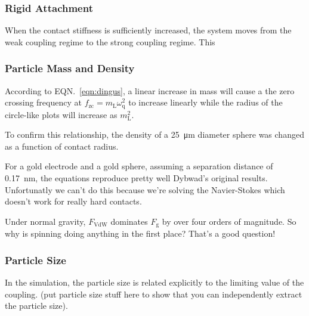 \documentclass[floatfix,superscriptaddress,a4paper,notitlepage]{revtex4-1}
\newcommand{\Equation}[1]{EQN.~\ref{#1}}
\newcommand{\Table}[1]{TBL.~\ref{#1}}
\newcommand{\ml}{m_\mathrm{L}}
\newcommand{\omegaq}{\omega_\mathrm{q}}
\begin{document}


\subsubsection{Rigid Attachment}
When the contact stiffness is sufficiently increased, the system moves from
the weak coupling regime to the strong coupling regime.  This 


\subsubsection{Particle Mass and Density}
According to \Equation{eqn:dingus}, a linear increase in mass will cause a
the zero crossing frequency at 
$f_\mathrm{zc} = \ml \omegaq^2$ to increase linearly while the radius of
the circle-like plots will increase as $\ml^2$.

To confirm this relationship, the density of a \SI{25}{\micro\meter}
diameter sphere was changed as a function of contact radius.

For a gold electrode and a gold sphere, assuming a separation distance of
\SI{0.17}{\nano\meter}, the equations reproduce pretty well Dybwad's
original results.  Unfortunatly we can't do this because we're solving the
Navier-Stokes which doesn't work for really hard contacts.

Under normal gravity, $F_\mathrm{VdW}$ dominates $F_\mathrm{g}$ by over
four orders of magnitude.  So why is spinning doing anything in the first
place?  That's a good question!

\subsubsection{Particle Size}
In the simulation, the particle size is related explicitly to the limiting
value of the coupling.
(put particle size stuff here to show that you can independently extract
the particle size).
\end{document}
